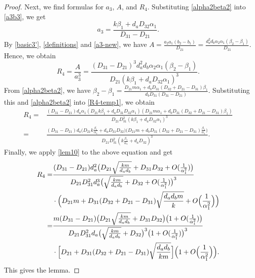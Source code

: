 \documentclass[10pt,a4paper]{amsart}
\begin{document}
\begin{proof}
Next, we find formulas for $a_3$, $A$, and $R_4$. Substituting \eqref{alpha2beta2} into \eqref{a3b3}, we get
\begin{equation} \label{a3-new}
a_3 = \frac{k \beta_1 + d_a D_{32} \alpha_1}{D_{31} - D_{21}}.
\end{equation}
By \eqref{basic3'}, \eqref{definitions} and \eqref{a3-new}, we have $A = \frac{a_2 a_1 (b_2 - b_1)}{D_{21}} = \frac{d_a^2 d_b \alpha_2 \alpha_1 (\beta_2 - \beta_1)}{D_{21}}$. Hence, we obtain
\begin{equation} \label{R4-temp1}
R_4 = \frac{A}{a_3^3} = \frac{(D_{31} - D_{21})^3 d_a^2 d_b \alpha_2 \alpha_1 (\beta_2 - \beta_1)}{D_{21} (k \beta_1 + d_a D_{32} \alpha_1)^3}.
\end{equation}
From \eqref{alpha2beta2}, we have $\beta_2 - \beta_1 = \frac{D_{21} m \alpha_1 + d_b D_{31} (D_{32} + D_{21} - D_{31}) \beta_1}{d_b D_{31} (D_{31} - D_{21})}$. Substituting this and \eqref{alpha2beta2} into \eqref{R4-temp1}, we obtain
\begin{align*}
R_4 =& \frac{(D_{31} - D_{21}) d_a \alpha_1 (D_{21} k \beta_1 + d_a D_{31} D_{32} \alpha_1) (D_{21} m \alpha_1 + d_b D_{31} (D_{32} + D_{21} - D_{31}) \beta_1)}{D_{21} D_{31}^2 (k \beta_1 + d_a D_{32} \alpha_1)^3} \\
=& \frac{(D_{31} - D_{21}) d_a \bigl( D_{21} k \frac{\beta_1}{\alpha_1} + d_a D_{31} D_{32} \bigr) \bigl(D_{21} m + d_b D_{31} (D_{32} + D_{21} - D_{31}) \frac{\beta_1}{\alpha_1} \bigr)}{D_{21} D_{31}^2 (k \frac{\beta_1}{\alpha_1} + d_a D_{32})^3}.
\end{align*}
Finally, we apply \eqref{lem10} to the above equation and get
\begin{align*}
R_4 =& \frac{(D_{31} - D_{21}) d_a^2 \bigl( D_{21} \sqrt{\frac{k m}{d_a d_b}} + D_{31} D_{32} + O( \frac{1}{\alpha_1^2} ) \bigr)}{D_{21} D_{31}^2 d_a^3 \bigl(\sqrt{\frac{k m}{d_a d_b}} + D_{32} + O( \frac{1}{\alpha_1^2} ) \bigr)^3} \\
&\cdot  \Bigl(D_{21} m + D_{31} (D_{32} + D_{21} - D_{31}) \sqrt{\frac{d_a d_b m}{k}} + O \Bigl( \frac{1}{\alpha_1^2} \Bigr) \Bigr) \\
=& \frac{m (D_{31} - D_{21}) \bigl( D_{21} \sqrt{\frac{k m}{d_a d_b}} + D_{31} D_{32} \bigr) \bigl( 1 + O( \frac{1}{\alpha_1^2} ) \bigr)}{D_{21} D_{31}^2 d_a \bigl(\sqrt{\frac{k m}{d_a d_b}} + D_{32} \bigr)^3 \bigl( 1 + O( \frac{1}{\alpha_1^2} ) \bigr)^3} \\
&\cdot  \Bigl[ D_{21} + D_{31} (D_{32} + D_{21} - D_{31}) \sqrt{\frac{d_a d_b}{k m}} \Bigr] \Bigl(1 + O \Bigl( \frac{1}{\alpha_1^2} \Bigr)  \Bigr).
\end{align*}
This gives the lemma.
\end{proof}
\end{document}

